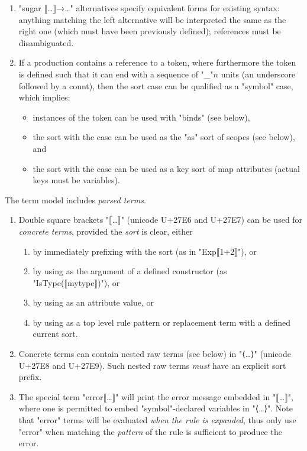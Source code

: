 \documentclass[12pt]{article} %
\begin{document}
\begin{manual}
\begin{enumerate}
  \item "sugar ⟦…⟧→…" alternatives specify equivalent forms for existing syntax: anything matching
    the left alternative will be interpreted the same as the right one (which must have been
    previously defined); references must be disambiguated.

  \item If a production contains a reference to a token, where furthermore the token is defined such
    that it can end with a sequence of "_"$n$ units (an underscore followed by a count), then the
    sort case can be qualified as a "symbol" case, which implies:
    \begin{itemize}
    \item instances of the token can be used with "binds" (see below),
    \item the sort with the case can be used as the "as" sort of scopes (see below), and
    \item the sort with the case can be used as a key sort of map attributes (actual keys must be variables).
    \end{itemize}

  \end{enumerate}
\end{manual}

\begin{manual}\label{man:parsed}
  The term model includes \emph{parsed terms}.
  \begin{enumerate}

  \item Double square brackets "⟦…⟧" (unicode U+27E6 and U+27E7) can be used for \emph{concrete
      terms}, provided the \emph{sort} is clear, either
    \begin{enumerate}
    \item by immediately prefixing with the sort (as in "Exp⟦1+2⟧"), or
    \item by using as the argument of a defined constructor (as "IsType(⟦mytype⟧)"), or
    \item by using as an attribute value, or
    \item by using as a top level rule pattern or replacement term with a defined current sort.
    \end{enumerate}

  \item Concrete terms can contain nested raw terms (see below) in "⟨…⟩" (unicode U+27E8 and
    U+27E9). Such nested raw terms \emph{must} have an explicit sort prefix.

  \item The special term "error⟦…⟧" will print the error message embedded in "⟦…⟧", where one is
    permitted to embed "symbol"-declared variables in "⟨…⟩". Note that "error" terms will be
    evaluated \emph{when the rule is expanded}, thus only use "error" when matching the
    \emph{pattern} of the rule is sufficient to produce the error.

  \end{enumerate}
\end{manual}
\end{document}
